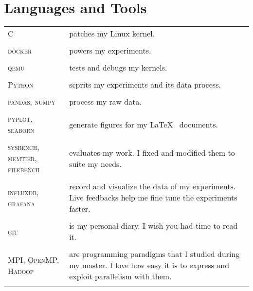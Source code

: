 \section{ Languages and Tools }

\begin{tabular}{p{2cm}|p{11cm}}

\textsc{C}   & patches my Linux kernel.\\
\multicolumn{2}{c}{} \\

\textsc{docker} & powers my experiments.\\
\multicolumn{2}{c}{} \\

\textsc{qemu}   & tests and debugs my kernels.\\
\multicolumn{2}{c}{} \\

\textsc{Python} & scprits my experiments and its data process.\\
\multicolumn{2}{c}{} \\

\textsc{pandas, numpy} & process my raw data. \\
\multicolumn{2}{c}{} \\

\textsc{pyplot, seaborn} & generate figures for my \LaTeX~ documents.\\
\multicolumn{2}{c}{} \\

\textsc{sysbench, memtier, filebench} & evaluates my work. \newline \footnotesize{I fixed and modified them to suite my needs.}\\
\multicolumn{2}{c}{} \\

\textsc{influxdb, grafana} & record and visualize the data of my experiments. \newline \footnotesize{Live feedbacks help me fine tune the experiments faster.}\\
\multicolumn{2}{c}{} \\

\textsc{git} & is my personal diary. \newline \footnotesize{I wish you had time to read it.}\\
\multicolumn{2}{c}{} \\

\textsc{MPI, OpenMP, Hadoop} & are programming paradigms that I studied during my master. \newline \footnotesize{I love how easy it is to express and exploit parallelism with them.}\\
\multicolumn{2}{c}{} \\


\end{tabular}
